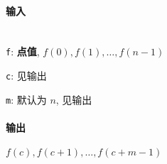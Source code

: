 \paragraph{输入}~\\

\verb|f|: \textbf{点值}, \(f(0), f(1), \dots, f(n-1)\)

\verb|c|: 见输出

\verb|m|: 默认为 \(n\), 见输出

\paragraph{输出}

\(f(c), f(c+1), \dots, f(c+m-1)\)
